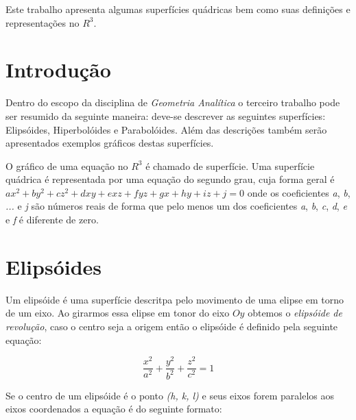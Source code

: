 \documentclass[
	article,			%
	11pt,				%
	oneside,			%
	a4paper,			%
	english,			%
	brazil,				%
	]{abntex2}
\begin{document}
\frenchspacing 

\maketitle

\begin{resumoumacoluna}
    
		Este trabalho apresenta algumas superfícies quádricas bem como suas
		definições e representações no $R^3$.

 \vspace{\onelineskip}
 
 \noindent
\end{resumoumacoluna}

\textual

    \section*{Introdução}

		Dentro do escopo da disciplina de \emph{Geometria Analítica} o terceiro
		trabalho pode ser resumido da seguinte maneira: deve-se descrever as
		seguintes superfícies:  Elipsóides, Hiperbolóides e Parabolóides. Além
		das descrições também serão apresentados exemplos gráficos destas
		superfícies.

		O gráfico de uma equação no $R^3$ é chamado de superfície. Uma
		superfície quádrica é representada por uma equação do segundo grau, cuja
		forma geral é $ ax^2 + by^2 + cz^2 + dxy + exz + fyz + gx + hy + iz + j
		= 0$ onde os coeficientes \emph{a}, \emph{b}, \emph{...} e \emph{j} são
		números reais de forma que pelo menos um dos coeficientes \emph{a},
		\emph{b}, \emph{c}, \emph{d}, \emph{e} e \emph{f} é diferente de zero.

    \section{Elipsóides}

		Um elipsóide é uma superfície descritpa pelo movimento de uma elipse em
		torno de um eixo. Ao girarmos essa elipse em tonor do eixo $Oy$ obtemos
		o \emph{elipsóide de revolução}, caso o centro seja a origem então o
		elipsóide é definido pela seguinte equação:

			$$\frac{x^2}{a^2}+\frac{y^2}{b^2}+\frac{z^2}{c^2}=1$$

		Se o centro de um elipsóide é o ponto \emph{(h, k, l)} e seus eixos
		forem paralelos aos eixos coordenados a equação é do seguinte formato:
\end{document}
